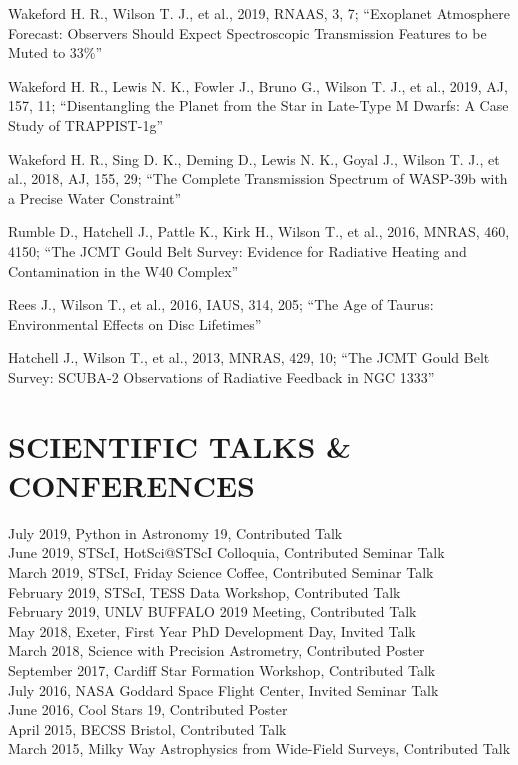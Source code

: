 \documentclass[letter, margin, 10pt]{res} %
\begin{document}
\begin{resume}
Wakeford H. R., Wilson T. J., et al., 2019, RNAAS, 3, 7; ``Exoplanet Atmosphere Forecast: Observers Should Expect Spectroscopic Transmission Features to be Muted to 33\%''

Wakeford H. R., Lewis N. K., Fowler J., Bruno G., Wilson T. J., et al., 2019, AJ, 157, 11; ``Disentangling the Planet from the Star in Late-Type M Dwarfs: A Case Study of TRAPPIST-1g''

Wakeford H. R., Sing D. K., Deming D., Lewis N. K., Goyal J., Wilson T. J., et al., 2018, AJ, 155, 29; ``The Complete Transmission Spectrum of WASP-39b with a Precise Water Constraint''

Rumble D., Hatchell J., Pattle K., Kirk H., Wilson T., et al., 2016, MNRAS, 460, 4150; ``The JCMT Gould Belt Survey: Evidence for Radiative Heating and Contamination in the W40 Complex''

Rees J., Wilson T., et al., 2016, IAUS, 314, 205; ``The Age of Taurus: Environmental Effects on Disc Lifetimes''

Hatchell J., Wilson T., et al., 2013, MNRAS, 429, 10; ``The JCMT Gould Belt Survey: SCUBA-2 Observations of Radiative Feedback in NGC 1333''


\parskip \baselineskip
\section{SCIENTIFIC TALKS \& CONFERENCES}

July 2019, Python in Astronomy 19, Contributed Talk\\
June 2019, STScI, HotSci@STScI Colloquia, Contributed Seminar Talk\\
March 2019, STScI, Friday Science Coffee, Contributed Seminar Talk\\
February 2019, STScI, TESS Data Workshop, Contributed Talk\\
February 2019, UNLV BUFFALO 2019 Meeting, Contributed Talk\\
May 2018, Exeter, First Year PhD Development Day, Invited Talk\\
March 2018, Science with Precision Astrometry, Contributed Poster\\
September 2017, Cardiff Star Formation Workshop, Contributed Talk\\
July 2016, NASA Goddard Space Flight Center, Invited Seminar Talk\\
June 2016, Cool Stars 19, Contributed Poster\\
April 2015, BECSS Bristol, Contributed Talk\\
March 2015, Milky Way Astrophysics from Wide-Field Surveys, Contributed Talk\\


\end{resume}
\end{document}
